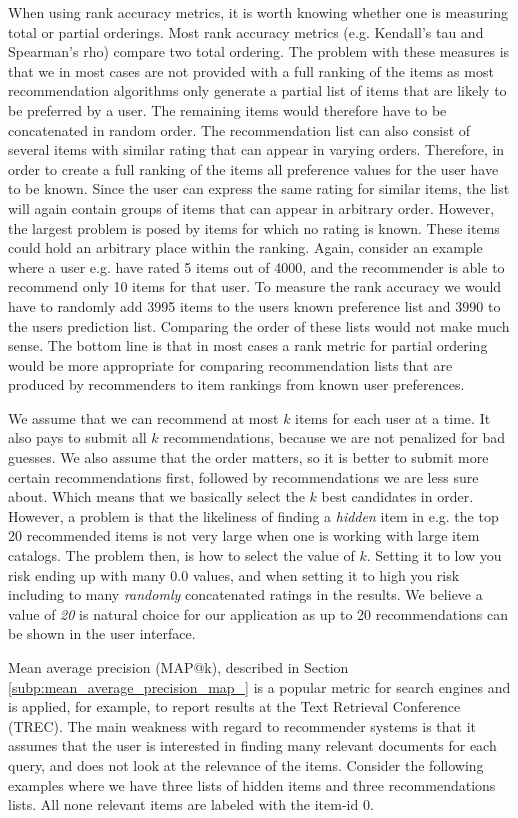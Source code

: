 When using rank accuracy metrics, it is worth knowing whether one is measuring total or partial orderings.
Most rank accuracy metrics (e.g. Kendall's tau and Spearman's rho) compare two total ordering. The problem
with these measures is that we in most cases are not provided with a full ranking of the items as most recommendation
algorithms only generate a partial list of items that are likely to be preferred by a user. The remaining items
would therefore have to be concatenated in random order. The recommendation list can also consist of several
items with similar rating that can appear in varying orders. Therefore, in order to create a full ranking of
the items all preference values for the user have to be known. Since the user can express the same rating for similar
items, the list will again contain groups of items that can appear in arbitrary order. However, the largest problem
is posed by items for which no rating is known. These items could hold an arbitrary place within the ranking.
Again, consider an example where a user e.g. have rated 5 items out of 4000, and the recommender is able to recommend
only 10 items for that user. To measure the rank accuracy we would have to randomly add 3995 items to the users known
preference list and 3990 to the users prediction list. Comparing the order of these lists would not make much sense.
The bottom line is that in most cases a rank metric for partial ordering would be more appropriate for comparing
recommendation lists that are produced by recommenders to item rankings from known user preferences.

We assume that we can recommend at most $k$ items for each user at a time. It also pays to submit all $k$
recommendations, because we are not penalized for bad guesses. We also assume that the order matters, so it
is better to submit more certain recommendations first, followed by recommendations we are less sure about.
Which means that we basically select the $k$ best candidates in order.
However, a problem is that the likeliness of finding a \emph{hidden} item in e.g. the top 20 recommended items
is not very large when one is working with large item catalogs. The problem then, is how to select the value of $k$.
Setting it to low you risk ending up with many $0.0$ values, and when setting it to high you risk including to many
\emph{randomly} concatenated ratings in the results. We believe a value of \textit{20} is natural choice for our
application as up to 20 recommendations can be shown in the user interface.

Mean average precision (MAP@k), described in Section \ref{subp:mean_average_precision_map_} is a popular metric for search
engines and is applied, for example, to report results at the Text Retrieval Conference (TREC). The main weakness with regard
to recommender systems is that it assumes that the user is interested in finding many relevant documents for each query, and
does not look at the relevance of the items. Consider the following examples where we have three lists of hidden items and
three recommendations lists. All none relevant items are labeled with the item-id $0$.

